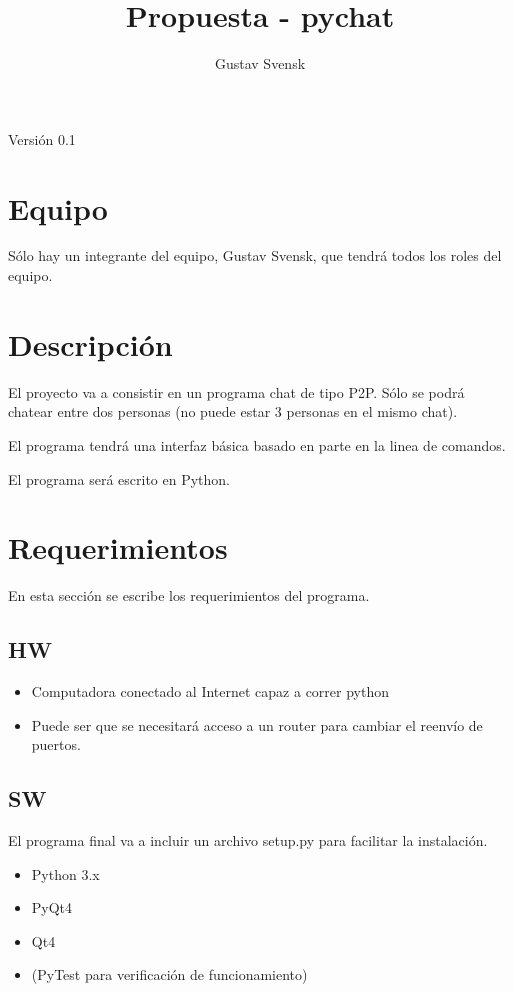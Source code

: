 \documentclass[a4paper, 12pt]{article}
\title{Propuesta - pychat}
\author{Gustav Svensk}
\begin{document}
\cfoot{\thepage}
\renewcommand{\headrulewidth}{0.4pt}


\maketitle
\thispagestyle{empty}
\begin{center}
        {\large Versión 0.1}
\end{center}
\newpage
\setcounter{page}{1}

\section{Equipo}
Sólo hay un integrante del equipo, Gustav Svensk, que tendrá todos los roles del
equipo.
\section{Descripción}
El proyecto va a consistir en un programa chat de tipo P2P. Sólo se
podrá chatear entre dos personas (no puede estar 3 personas en el mismo
chat).

El programa tendrá una interfaz básica basado en parte en la linea de comandos.

El programa será escrito en Python.
\section{Requerimientos}
En esta sección se escribe los requerimientos del programa.
\subsection{HW}
\begin{itemize}
        \item Computadora conectado al Internet capaz a correr python
        \item Puede ser que se necesitará acceso a un router para cambiar el
                reenvío de puertos.
\end{itemize}
\subsection{SW}
El programa final va a incluir un archivo setup.py para facilitar la
instalación.
\begin{itemize}
        \item Python 3.x
        \item PyQt4
        \item Qt4
        \item (PyTest para verificación de funcionamiento)
\end{itemize}
\end{document}
